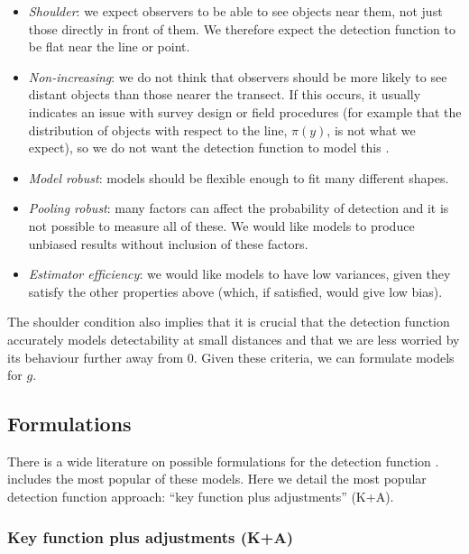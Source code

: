 \documentclass[article]{jss}\usepackage[]{graphicx}\usepackage[]{color}
\begin{document}
\begin{itemize}
\item \textit{Shoulder}: we expect observers to be able to see objects near them, not just those directly in front of them. We therefore expect the detection function to be flat near the line or point.
\item \textit{Non-increasing}: we do not think that observers should be more likely to see distant objects than those nearer the transect. If this occurs, it usually indicates an issue with survey design or field procedures (for example that the distribution of objects with respect to the line, $\pi(y)$, is not what we expect), so we do not want the detection function to model this \citep{Marques:2010he, Marques:2012fy, Miller:2015hw}.
\item \textit{Model robust}: models should be flexible enough to fit many different shapes.
\item \textit{Pooling robust}: many factors can affect the probability of detection and it is not possible to measure all of these. We would like models to produce unbiased results without inclusion of these factors.
\item \textit{Estimator efficiency}: we would like models to have low variances, given they satisfy the other properties above (which, if satisfied, would give low bias).
\end{itemize}

The shoulder condition also implies that it is crucial that the detection function accurately models detectability at small distances and that we are less worried by its behaviour further away from 0. Given these criteria, we can formulate models for $g$.

\subsection{Formulations}

There is a wide literature on possible formulations for the detection function \citep{Buckland:1992fa, Eidous:2005bj, Becker:2009cj, Giammarino:2014eg, Miller:2015hw, Becker:2015fi}.  includes the most popular of these models. Here we detail the most popular detection function approach: ``key function plus adjustments'' (K+A).

\subsubsection{Key function plus adjustments (K+A)}
\end{document}
